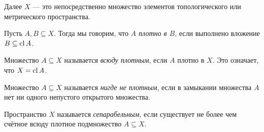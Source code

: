 \begin{note}
	Далее $X$ --- это непосредственно множество элементов топологического или метрического пространства.
\end{note}

\begin{definition}
	Пусть $A, B \subseteq X$. Тогда мы говорим, что \textit{$A$ плотно в $B$}, если выполнено вложение $B \subseteq \operatorname{cl} A$.
\end{definition}

\begin{definition}
	Множество $A \subseteq X$ называется \textit{всюду плотным}, если $A$ плотно в $X$. Это означает, что $X = \operatorname{cl} A$.
\end{definition}

\begin{definition}
	Множество $A \subseteq X$ называется \textit{нигде не плотным}, если в замыкании множества $A$ нет ни одного непустого открытого множества.
\end{definition}

\begin{definition}
	Пространство $X$ называется \textit{сепарабельным}, если существует не более чем счётное всюду плотное подмножество $A \subseteq X$.
\end{definition}